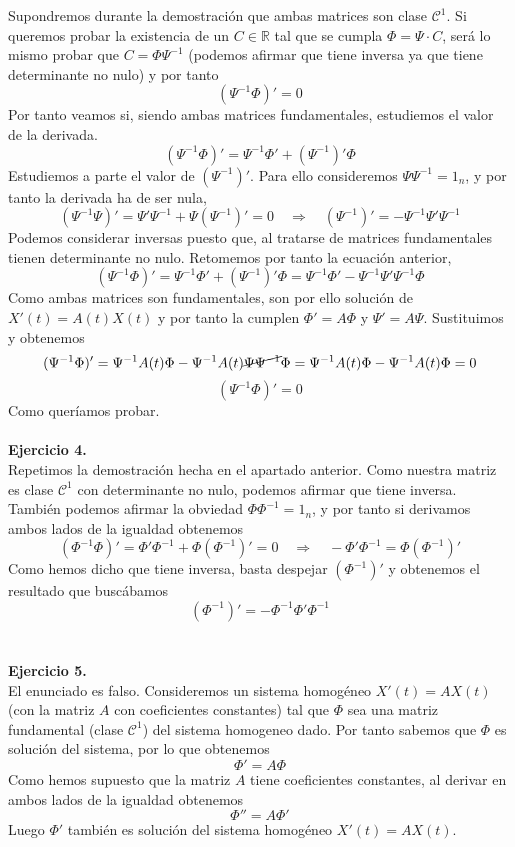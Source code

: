 \documentclass[fleqn]{article}
\def\R{\mathds{R}}
\def\next{\quad \Rightarrow \quad}
\begin{document}
    Supondremos durante la demostración que ambas matrices son clase $\mathcal{C}^1$. Si queremos probar la existencia de un $C \in \R$ tal que se cumpla $\Phi = \Psi \cdot C$, será lo mismo probar que $C = \Phi \Psi^{-1}$ 
    (podemos afirmar que tiene inversa ya que tiene determinante no nulo) y por tanto 
    $$(\Psi^{-1}\Phi)' = 0$$
    Por tanto veamos si, siendo ambas matrices fundamentales, estudiemos el valor de la derivada. 
    $$(\Psi^{-1}\Phi)' = \Psi^{-1} \Phi'  + (\Psi^{-1})' \Phi $$
    Estudiemos a parte el valor de $(\Psi^{-1})'$. Para ello consideremos $\Psi \Psi^{-1} = 1_n$, y por tanto la derivada ha de ser nula, 
    $$(\Psi^{-1}\Psi)' = \Psi' \Psi^{-1} + \Psi (\Psi^{-1})'= 0 \next (\Psi^{-1})' = - \Psi^{-1}\Psi' \Psi^{-1}$$
    Podemos considerar inversas puesto que, al tratarse de matrices fundamentales tienen determinante no nulo. Retomemos por tanto la ecuación anterior, 
    $$(\Psi^{-1}\Phi)' = \Psi^{-1}\Phi' + (\Psi^{-1})' \Phi  = \Psi^{-1} \Phi' - \Psi^{-1}\Psi' \Psi^{-1} \Phi  $$
    Como ambas matrices son fundamentales, son por ello solución de $X'(t) = A(t) X(t)$ y por tanto la cumplen $\Phi' = A\Phi$ y $\Psi' = A\Psi$. Sustituimos y obtenemos
    $$(\Psi^{-1}\Phi)' = \Psi^{-1} A(t)\Phi - \Psi^{-1}A(t) \cancel{\Psi \Psi^{-1}} \Phi = \Psi^{-1} A(t)\Phi - \Psi^{-1} A(t)\Phi = 0$$
    $$(\Psi^{-1}\Phi)' = 0$$
    Como queríamos probar.\\ \\

    \textbf{Ejercicio 4. } \\

    Repetimos la demostración hecha en el apartado anterior. Como nuestra matriz es clase $\mathcal{C}^1$ con determinante no nulo, podemos afirmar que tiene inversa. También podemos afirmar
    la obviedad $\Phi \Phi^{-1} = 1_n$, y por tanto si derivamos ambos lados de la igualdad obtenemos
    $$(\Phi^{-1}\Phi)' = \Phi' \Phi^{-1} + \Phi (\Phi^{-1})'= 0 \next - \Phi' \Phi^{-1} = \Phi (\Phi^{-1})'$$
    Como hemos dicho que tiene inversa, basta despejar $(\Phi^{-1})'$ y obtenemos el resultado que buscábamos
    $$(\Phi^{-1})' = - \Phi^{-1} \Phi' \Phi^{-1} $$\\ \\

    \textbf{Ejercicio 5. } \\
    El enunciado es falso. Consideremos un sistema homogéneo $X'(t) = A X(t)$ (con la matriz $A$ con coeficientes constantes) tal que $\Phi$ sea una matriz fundamental (clase $\mathcal{C}^1$) del sistema homogeneo
    dado. Por tanto sabemos que $\Phi$ es solución del sistema, por lo que obtenemos 
    $$\Phi' = A \Phi$$
    Como hemos supuesto que la matriz $A$ tiene coeficientes constantes, al derivar en ambos lados de la igualdad obtenemos 
    $$\Phi'' = A \Phi'$$
    Luego $\Phi'$ también es solución del sistema homogéneo $X'(t) = A X(t)$.
    
\end{document}

